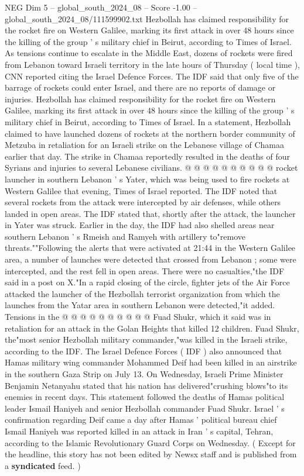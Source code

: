 \begin{textsample}{NEG Dim 5 – global\_south\_2024\_08 – Score -1.00 – global\_south\_2024\_08/111599902.txt}  \label{ex:f5_neg_125}
Hezbollah has claimed responsibility for the rocket fire on Western Galilee, marking its first attack in over 48 hours since the killing of the group ' s military chief in Beirut, according to Times of Israel.
As tensions continue to escalate in the Middle East, dozens of rockets were fired from Lebanon toward Israeli territory in the late hours of Thursday ( local time ), CNN reported citing the Israel Defence Forces.
The IDF said that only five of the barrage of rockets could enter Israel, and there are no reports of damage or injuries.
Hezbollah has claimed responsibility for the rocket fire on Western Galilee, marking its first attack in over 48 hours since the killing of the group ' s military chief in Beirut, according to Times of Israel.
In a statement, Hezbollah claimed to have launched dozens of rockets at the northern border community of Metzuba in retaliation for an Israeli strike on the Lebanese village of Chamaa earlier that day.
The strike in Chamaa reportedly resulted in the deaths of four Syrians and injuries to several Lebanese civilians. @ @ @ @ @ @ @ @ @ @ rocket launcher in southern Lebanon ' s Yater, which was being used to fire rockets at Western Galilee that evening, Times of Israel reported.
The IDF noted that several rockets from the attack were intercepted by air defenses, while others landed in open areas.
The IDF stated that, shortly after the attack, the launcher in Yater was struck.
Earlier in the day, the IDF had also shelled areas near southern Lebanon ' s Rmeish and Ramyeh with artillery to"remove threats.""Following the alerts that were activated at 21:44 in the Western Galilee area, a number of launches were detected that crossed from Lebanon ; some were intercepted, and the rest fell in open areas.
There were no casualties,"the IDF said in a post on X."In a rapid closing of the circle, fighter jets of the Air Force attacked the launcher of the Hezbollah terrorist organization from which the launches from the Yatar area in southern Lebanon were detected,"it added.
Tensions in the @ @ @ @ @ @ @ @ @ @ Fuad Shukr, which it said was in retaliation for an attack in the Golan Heights that killed 12 children.
Fuad Shukr, the"most senior Hezbollah military commander,"was killed in the Israeli strike, according to the IDF.
The Israel Defence Forces ( IDF ) also announced that Hamas military wing commander Mohammed Deif had been killed in an airstrike in the southern Gaza Strip on July 13.
On Wednesday, Israeli Prime Minister Benjamin Netanyahu stated that his nation has delivered"crushing blows"to its enemies in recent days.
This statement followed the deaths of Hamas political leader Ismail Haniyeh and senior Hezbollah commander Fuad Shukr.
Israel ' s confirmation regarding Deif came a day after Hamas ' political bureau chief Ismail Haniyeh was reported killed in an attack in Iran ' s capital, Tehran, according to the Islamic Revolutionary Guard Corps on Wednesday. ( Except for the headline, this story has not been edited by Newsx staff and is published from a \textbf{syndicated} feed. )

\end{textsample}
